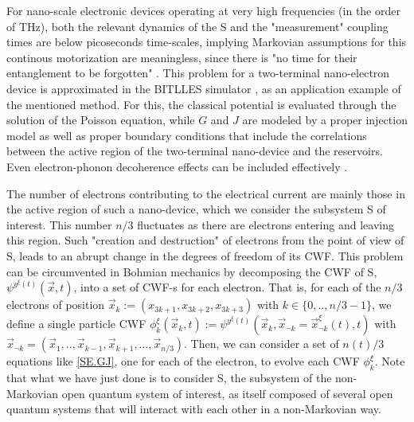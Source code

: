 \documentclass[11pt, a4paper]{article} %
\begin{document}
For nano-scale electronic devices operating at very high frequencies (in the order of THz), both the relevant dynamics of the S and the "measurement" coupling times are below picoseconds time-scales, implying Markovian assumptions for this continous motorization are meaningless, since there is "no time for their entanglement to be forgotten" \cite{Thz}. This problem for a two-terminal nano-electron device is approximated in the BITLLES simulator \cite{tdp,Pois,Thz}, as an application example of the mentioned method. For this, the classical potential is evaluated through the solution of the Poisson equation\cite{Pois}, while $G$ and $J$ are modeled by a proper injection model \cite{inject} as well as proper boundary conditions \cite{boundary1, boundary2} that include the correlations between the active region of the two-terminal nano-device and the reservoirs. Even electron-phonon decoherence effects can be included effectively \cite{eph}.

The number of electrons contributing to the electrical current are mainly those in the active region of such a nano-device, which we consider the subsystem S of interest. This number $n/3$ fluctuates as there are electrons entering and leaving this region. Such "creation and destruction" of electrons from the point of view of S, leads to an abrupt change in the degrees of freedom of its CWF. This problem can be circumvented in Bohmian mechanics by decomposing the CWF of S, $\psi^{y^\xi(t)}(\vec{x},t)$, into a set of CWF-s for each electron. That is, for each of the $n/3$ electrons of position $\vec{x}_k:=(x_{3k+1}, x_{3k+2}, x_{3k+3})$ with $k\in\{0,..,n/3-1\}$, we define a single particle CWF $\phi_k^\xi(\vec{x}_k, t):=\psi^{y^\xi(t)}(\vec{x}_k, \vec{x}_{\neg k}=\vec{x}_{\neg k}^\xi(t),t)$ with $\vec{x}_{\neg k}=(\vec{x}_1,..,\vec{x}_{k-1}, \vec{x}_{k+1}, ...,\vec{x}_{n/3})$. Then, we can consider a set of $n(t)/3$ equations like \eqref{SE.GJ}, one for each of the electron, to evolve each CWF $\phi_k^\xi$. Note that what we have just done is to consider S, the subsystem of the non-Markovian open quantum system of interest, as itself composed of several open quantum systems that will interact with each other in a non-Markovian way.
\end{document}
